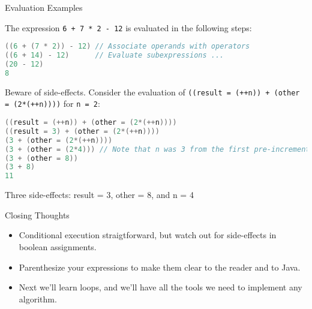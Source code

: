 \documentclass{beamer}
\begin{document}
\begin{frame}[fragile]{Evaluation Examples}


The expression {\tt 6 + 7 * 2 - 12} is evaluated in the following steps:
\begin{lstlisting}[language=Java]
((6 + (7 * 2)) - 12) // Associate operands with operators
((6 + 14) - 12)      // Evaluate subexpressions ...
(20 - 12)
8
\end{lstlisting}
\vspace{-.05in}
Beware of side-effects.  Consider the evaluation of {\tt ((result = (++n)) + (other = (2*(++n))))} for {\tt n = 2}:
\begin{lstlisting}[language=Java]
((result = (++n)) + (other = (2*(++n))))
((result = 3) + (other = (2*(++n))))
(3 + (other = (2*(++n))))
(3 + (other = (2*4))) // Note that n was 3 from the first pre-increment
(3 + (other = 8))
(3 + 8)
11
\end{lstlisting}
\vspace{-.05in}
Three side-effects: result = 3, other = 8, and n = 4

\end{frame}


\begin{frame}[fragile]{Closing Thoughts}


\begin{itemize}
\item Conditional execution straigtforward, but watch out for side-effects in boolean assignments.
\item Parenthesize your expressions to make them clear to the reader and to Java.
\item Next we'll learn loops, and we'll have all the tools we need to implement any algorithm.
\end{itemize}


\end{frame}
\end{document}
